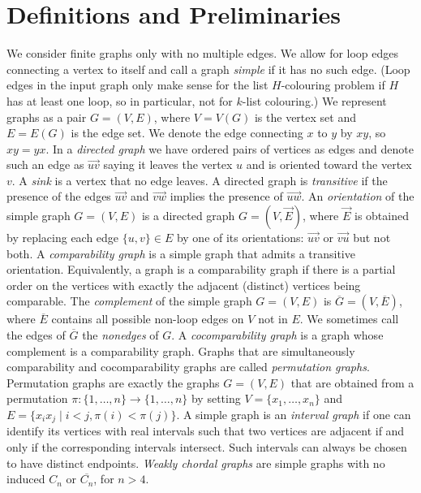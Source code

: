 \documentclass[12pt]{llncs}
\begin{document}
\section{Definitions and Preliminaries}
We consider finite graphs only with no multiple edges. We allow for loop
edges connecting a vertex to itself and call a graph {\em simple} if it has
no such edge. (Loop edges in the input graph only make
sense for the list
$H$-colouring problem if $H$ has at least one loop, so in particular, not for
$k$-list colouring.) We represent graphs as a pair $G = (V, E)$, where
$V=V(G)$ is the vertex set and $E=E(G)$ is the edge set. We denote the edge
connecting $x$ to $y$ by $xy$, so $xy=yx$. In a {\em
directed graph} we have ordered pairs of vertices as edges and
denote such an edge as $\overrightarrow{uv}$ saying it leaves the
vertex $u$ and is oriented toward the vertex $v$. A {\em sink} is a
vertex that no edge leaves. A directed graph is {\em transitive} if
the presence of the edges $\overrightarrow{uv}$ and $\overrightarrow{vw}$
implies the presence of $\overrightarrow{uw}$. An {\em orientation} of
the simple graph $G=(V,E)$ is a directed graph $G=(V,\overrightarrow E)$,
where $\overrightarrow E$ is obtained by replacing each edge
$\{u,v\}\in E$ by one of its orientations: $\overrightarrow{uv}$ or
$\overrightarrow{vu}$ but not both. A {\em comparability graph} is a
simple graph that admits a transitive orientation. Equivalently, a graph is a
comparability graph if there is a partial order on the vertices with
exactly the adjacent (distinct) vertices being comparable. The {\em
complement} of the simple graph $G=(V,E)$ is $\overline G=(V,\overline E)$,
where $\overline E$ contains all possible non-loop edges on $V$ not in $E$. We
sometimes call the edges of $\overline G$ the {\em nonedges} of $G$. A {\em
cocomparability graph} is a graph whose complement is a
comparability graph.
Graphs that are simultaneously comparability and cocomparability graphs are called {\em permutation graphs}. Permutation graphs are exactly the graphs $G=(V,E)$ that are obtained from a permutation $\pi:\{1,\ldots,n\}\to\{1,\ldots,n\}$ by setting $V=\{x_1,\ldots,x_n\}$ and $E=\{x_ix_j\mid i<j,\pi(i)<\pi(j)\}$. A
simple graph is an {\em interval
graph} if one can identify its vertices with real intervals
such that two vertices are adjacent if and only if the corresponding
intervals intersect.
Such intervals can always be chosen to have distinct endpoints.
{\em Weakly chordal graphs} are simple graphs with no induced $C_n$ or $\overline{C_n}$, for $n>4$.
\end{document}
